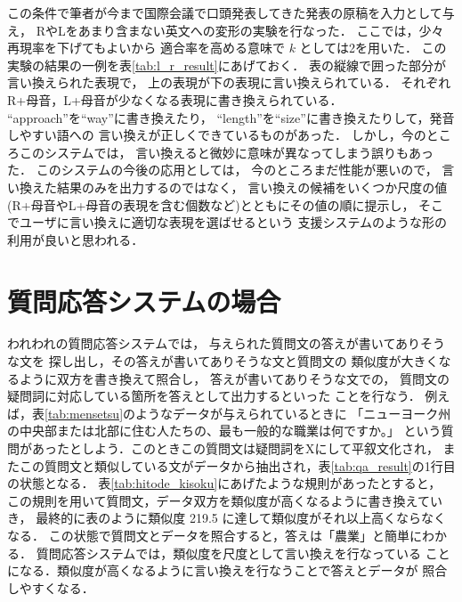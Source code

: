この条件で筆者が今まで国際会議で口頭発表してきた発表の原稿を入力として与え，
RやLをあまり含まない英文への変形の実験を行なった．
ここでは，少々再現率を下げてもよいから
適合率を高める意味で $k$ としては2を用いた．
この実験の結果の一例を表\ref{tab:l_r_result}にあげておく．
表の縦線で囲った部分が言い換えられた表現で，
上の表現が下の表現に言い換えられている．
それぞれR+母音，L+母音が少なくなる表現に書き換えられている．
``approach''を``way''に書き換えたり，
``length''を``size''に書き換えたりして，発音しやすい語への
言い換えが正しくできているものがあった．
しかし，今のところこのシステムでは，
言い換えると微妙に意味が異なってしまう誤りもあった．
このシステムの今後の応用としては，
今のところまだ性能が悪いので，
言い換えた結果のみを出力するのではなく，
言い換えの候補をいくつか尺度の値(R+母音やL+母音の表現を含む個数など)とともにその値の順に提示し，
そこでユーザに言い換えに適切な表現を選ばせるという
支援システムのような形の利用が良いと思われる．

\section{質問応答システムの場合}

われわれの質問応答システム\cite{murata2000_1_nl}では，
与えられた質問文の答えが書いてありそうな文を
探し出し，その答えが書いてありそうな文と質問文の
類似度が大きくなるように双方を書き換えて照合し，
答えが書いてありそうな文での，
質問文の疑問詞に対応している箇所を答えとして出力するといった
ことを行なう．
例えば，表\ref{tab:mensetsu}のようなデータ\cite{eiken2k}が与えられているときに
「ニューヨーク州の中央部または北部に住む人たちの、最も一般的な職業は何ですか。」
という質問があったとしよう．このときこの質問文は疑問詞をXにして平叙文化され，
またこの質問文と類似している文がデータから抽出され，表\ref{tab:qa_result}の1行目の状態となる．
表\ref{tab:hitode_kisoku}にあげたような規則があったとすると，
この規則を用いて質問文，データ双方を類似度が高くなるように書き換えていき，
最終的に表のように類似度 219.5 に達して類似度がそれ以上高くならなくなる．
この状態で質問文とデータを照合すると，答えは「農業」と簡単にわかる．
質問応答システムでは，類似度を尺度として言い換えを行なっている
ことになる．類似度が高くなるように言い換えを行なうことで答えとデータが
照合しやすくなる．

